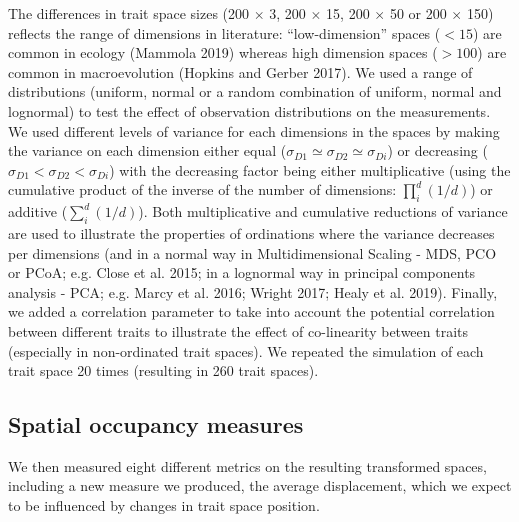 \documentclass[]{article}
\begin{document}
The differences in trait space sizes (200 \(\times\) 3, 200 \(\times\)
15, 200 \(\times\) 50 or 200 \(\times\) 150) reflects the range of
dimensions in literature: ``low-dimension'' spaces (\(<15\)) are common
in ecology (Mammola 2019) whereas high dimension spaces (\(>100\)) are
common in macroevolution (Hopkins and Gerber 2017). We used a range of
distributions (uniform, normal or a random combination of uniform,
normal and lognormal) to test the effect of observation distributions on
the measurements. We used different levels of variance for each
dimensions in the spaces by making the variance on each dimension either
equal (\(\sigma_{D1} \simeq \sigma_{D2} \simeq \sigma_{Di}\)) or
decreasing (\(\sigma_{D1} < \sigma_{D2} < \sigma_{Di}\)) with the
decreasing factor being either multiplicative (using the cumulative
product of the inverse of the number of dimensions: \(\prod_i^d(1/d)\))
or additive (\(\sum_i^d(1/d)\)). Both multiplicative and cumulative
reductions of variance are used to illustrate the properties of
ordinations where the variance decreases per dimensions (and in a normal
way in Multidimensional Scaling - MDS, PCO or PCoA; e.g. Close et al.
2015; in a lognormal way in principal components analysis - PCA; e.g.
Marcy et al. 2016; Wright 2017; Healy et al. 2019). Finally, we added a
correlation parameter to take into account the potential correlation
between different traits to illustrate the effect of co-linearity
between traits (especially in non-ordinated trait spaces). We repeated
the simulation of each trait space 20 times (resulting in 260 trait
spaces).

\subsection{Spatial occupancy
measures}\label{spatial-occupancy-measures}

We then measured eight different metrics on the resulting transformed
spaces, including a new measure we produced, the average displacement,
which we expect to be influenced by changes in trait space position.
\end{document}
